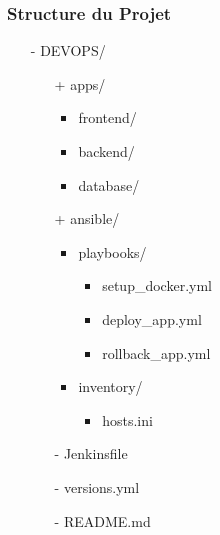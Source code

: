 \documentclass[aspectratio=169]{beamer}
\begin{document}
\begin{frame}
    \frametitle{Structure du Projet}
    \begin{itemize}
        \item[-] DEVOPS/
        \begin{itemize}
            \item[+] apps/
            \begin{itemize}
                \item frontend/
                \item backend/
                \item database/
            \end{itemize}
            \item[+] ansible/
            \begin{itemize}
                \item playbooks/
                \begin{itemize}
                    \item setup\_docker.yml
                    \item deploy\_app.yml
                    \item rollback\_app.yml
                \end{itemize}
                \item inventory/
                \begin{itemize}
                    \item hosts.ini
                \end{itemize}
            \end{itemize}
            \item[-] Jenkinsfile
            \item[-] versions.yml
            \item[-] README.md
        \end{itemize}
    \end{itemize}
\end{frame}

\end{document}
